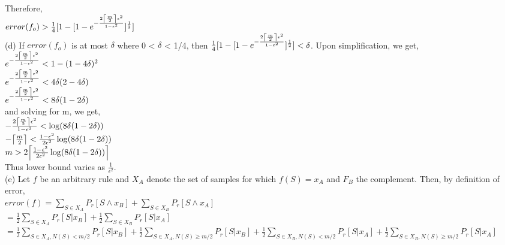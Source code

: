 \documentclass[10pt]{article}
\DeclarePairedDelimiter\ceil{\lceil}{\rceil}
\begin{document}
\begin{flushleft}
Therefore,\\
\hspace{2em} $error(f_{o}) > \frac{1}{4} [1 - [1 - e^{- \frac{2 \ceil*{\frac{m}{2}} \epsilon^{2}}{1- \epsilon^{2}}}]^{\frac{1}{2}}]$\\
\vspace{0.5em}
(d) If $error(f_{o})$ is at most $\delta$ where 0 < $\delta$ < 1/4, then $\frac{1}{4} [1 - [1 - e^{- \frac{2 \ceil*{\frac{m}{2}} \epsilon^{2}}{1- \epsilon^{2}}}]^{\frac{1}{2}}] < \delta$. Upon simplification, we get, \\
\hspace{2em} $e^{- \frac{2 \ceil*{\frac{m}{2}} \epsilon^{2}}{1- \epsilon^{2}}} < 1 - (1- 4\delta)^{2}$\\
\hspace{2em} $e^{- \frac{2 \ceil*{\frac{m}{2}} \epsilon^{2}}{1- \epsilon^{2}}} < 4\delta ( 2- 4\delta)$\\
\hspace{2em} $e^{- \frac{2 \ceil*{\frac{m}{2}} \epsilon^{2}}{1- \epsilon^{2}}} < 8\delta (1 - 2\delta)$\\
and solving for m, we get, \\
\hspace{2em} $- \frac{2 \ceil*{\frac{m}{2}} \epsilon^{2}}{1- \epsilon^{2}} < \log(8\delta (1 - 2\delta))$\\ 
\hspace{2em} $- \ceil*{\frac{m}{2}} < \frac{1- \epsilon^{2}}{2 \epsilon^{2}} \log(8\delta (1 - 2\delta))$\\
\hspace{2em} $ m > 2 \ceil*{\frac{1- \epsilon^{2}}{2 \epsilon^{2}} \log(8\delta (1 - 2\delta))}$\\
Thus lower bound varies as $\frac{1}{\epsilon^{2}}$.\\
\vspace{5em}
(e) Let $f$ be an arbitrary rule and $X_{A}$ denote the set of samples for which $f(S) = x_{A}$ and $F_{B}$ the complement. Then, by definition of error,\\
\hspace{2em} $error(f) = \sum\limits_{S \in X_{A}} P_{r}[S \land x_{B}] + \sum\limits_{S \in X_{B}} P_{r}[S \land x_{A}]$\\
\hspace{2em} \hspace{3.4em} $ = \frac{1}{2} \sum\limits_{S \in X_{A}} P_{r} [S \lvert x_{B}] + \frac{1}{2} \sum\limits_{S \in X_{B}} P_{r}[S \lvert x_{A}]$\\
\hspace{2em} \hspace{3.4em} $ = \frac{1}{2} \sum\limits_{S \in X_{A}, N(S)< m/2} P_{r} [S \lvert x_{B}] + \frac{1}{2} \sum\limits_{S \in X_{A}, N(S) \geq m/2} P_{r} [S \lvert x_{B}] + \frac{1}{2} \sum\limits_{S \in X_{B}, N(S) < m/2} P_{r}[S \lvert x_{A}] +\frac{1}{2} \sum\limits_{S \in X_{B}, N(S) \geq m/2} P_{r}[S \lvert x_{A}]$\\

\end{flushleft}
\end{document}
